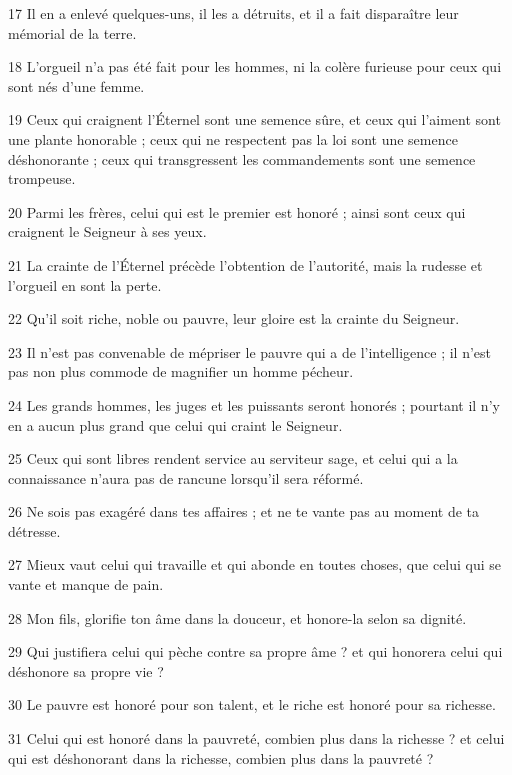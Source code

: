 \par 17 Il en a enlevé quelques-uns, il les a détruits, et il a fait disparaître leur mémorial de la terre.
\par 18 L'orgueil n'a pas été fait pour les hommes, ni la colère furieuse pour ceux qui sont nés d'une femme.
\par 19 Ceux qui craignent l'Éternel sont une semence sûre, et ceux qui l'aiment sont une plante honorable ; ceux qui ne respectent pas la loi sont une semence déshonorante ; ceux qui transgressent les commandements sont une semence trompeuse.
\par 20 Parmi les frères, celui qui est le premier est honoré ; ainsi sont ceux qui craignent le Seigneur à ses yeux.
\par 21 La crainte de l'Éternel précède l'obtention de l'autorité, mais la rudesse et l'orgueil en sont la perte.
\par 22 Qu'il soit riche, noble ou pauvre, leur gloire est la crainte du Seigneur.
\par 23 Il n'est pas convenable de mépriser le pauvre qui a de l'intelligence ; il n’est pas non plus commode de magnifier un homme pécheur.
\par 24 Les grands hommes, les juges et les puissants seront honorés ; pourtant il n’y en a aucun plus grand que celui qui craint le Seigneur.
\par 25 Ceux qui sont libres rendent service au serviteur sage, et celui qui a la connaissance n'aura pas de rancune lorsqu'il sera réformé.
\par 26 Ne sois pas exagéré dans tes affaires ; et ne te vante pas au moment de ta détresse.
\par 27 Mieux vaut celui qui travaille et qui abonde en toutes choses, que celui qui se vante et manque de pain.
\par 28 Mon fils, glorifie ton âme dans la douceur, et honore-la selon sa dignité.
\par 29 Qui justifiera celui qui pèche contre sa propre âme ? et qui honorera celui qui déshonore sa propre vie ?
\par 30 Le pauvre est honoré pour son talent, et le riche est honoré pour sa richesse.
\par 31 Celui qui est honoré dans la pauvreté, combien plus dans la richesse ? et celui qui est déshonorant dans la richesse, combien plus dans la pauvreté ?


